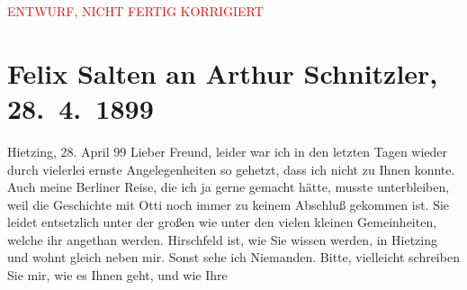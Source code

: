 
\begin{center}
            \textcolor{red}{ENTWURF, NICHT FERTIG KORRIGIERT}
                      \end{center}
            
         
         \renewcommand{\erwaehntePersonen}{Personen: Georg Hirschfeld, Ottilie Salten}
         \renewcommand{\erwaehnteInstitutionen}{Institutionen: Deutsches Theater Berlin}
         \renewcommand{\erwaehnteOrte}{Orte: Berlin, Wien, XIII., Hietzing}
         \renewcommand{\erwaehnteWerke}{Werke: Der grüne Kakadu – Paracelsus – Die Gefährtin. Drei Einakter}
               \section[Felix Salten an Arthur Schnitzler, 28. 4. 1899]{ Felix Salten an Arthur Schnitzler, 28. 4. 1899}\nopagebreak{}\rehead{ }\begin{ledgroupsized}[t]{13cm}\normalsize\beginnumbering \toendnotes[C]{\smallbreak\pagebreak[2]} 
\toendnotes[C]{\smallbreak}\pstart
           \raggedleft{}{\pb} Hietzing, 28. April 99\pend
           \pstart
           Lieber Freund, leider war ich in den letzten Tagen wieder durch
               vielerlei ernste Angelegenheiten so gehetzt, dass ich nicht zu Ihnen konnte. Auch
               meine Berliner Reise, die ich ja gerne gemacht
               hätte, musste unterbleiben, weil die Geschichte mit Otti noch immer zu keinem Abschluß gekommen ist. Sie leidet entsetzlich
               unter der großen wie unter den vielen kleinen Gemeinheiten, welche ihr angethan
               werden. Hirschfeld ist, wie Sie wissen werden,
               in Hietzing und wohnt gleich neben mir. Sonst sehe
               ich Niemanden. Bitte, vielleicht schreiben Sie mir, wie es Ihnen geht, und wie Ihre

\end{ledgroupsized}
